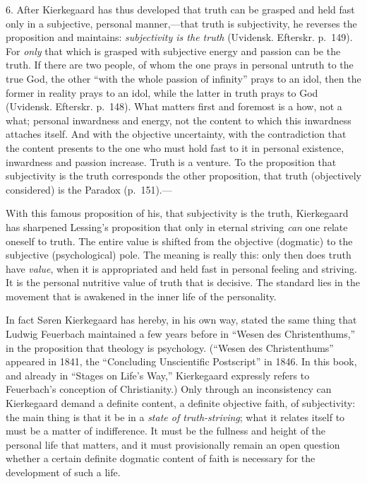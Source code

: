 \documentclass[12pt,a4paper]{book}
\newcommand{\opage}[1]{\marginnote{\footnotesize\textit{[#1]}}}
\begin{document}
6. After Kierkegaard has thus developed that truth can be grasped and
held fast only in a subjective, personal manner,---that truth is
subjectivity, he reverses the proposition and maintains:
\textit{subjectivity is the truth} (Uvidensk. Efterskr. p.~149). For
\textit{only} that which is grasped with subjective energy and passion
can be the truth. If there are two people, of whom the one prays in
personal untruth to the true God, the other ``with the whole passion of
infinity'' prays to an idol, then the former in reality prays to an idol,
while the latter in truth prays to God (Uvidensk. Efterskr. p.~148). What
matters first and foremost is a
\opage{68}how, not a what; personal inwardness and energy, not the content to
which this inwardness attaches itself. And with the objective
uncertainty, with the contradiction that the content presents to the one
who must hold fast to it in personal existence, inwardness and passion
increase. Truth is a venture. To the proposition that subjectivity is the
truth corresponds the other proposition, that truth (objectively
considered) is the Paradox (p.~151).---

With this famous proposition of his, that subjectivity is the truth,
Kierkegaard has sharpened Lessing's proposition that only in eternal
striving \textit{can} one relate oneself to truth. The entire value is
shifted from the objective (dogmatic) to the subjective (psychological)
pole. The meaning is really this: only then does truth have
\textit{value}, when it is appropriated and held fast in personal feeling
and striving. It is the personal nutritive value of truth that is
decisive. The standard lies in the movement that is awakened in the inner
life of the personality.

In fact Søren Kierkegaard has hereby, in his own way, stated the same
thing that Ludwig Feuerbach maintained a few years before in ``Wesen des
Christenthums,'' in the proposition that theology is psychology. (``Wesen
des Christenthums'' appeared in 1841, the ``Concluding Unscientific
Postscript'' in 1846. In this book, and already in ``Stages on Life's
Way,'' Kierkegaard expressly refers to Feuerbach's conception of
Christianity.) Only through an inconsistency can Kierkegaard demand a
definite content, a definite objective faith, of subjectivity: the main
thing is that it be in a \textit{state of truth-striving}; what it
relates itself to must be a matter of indifference. It must be the
fullness and height of the personal life that matters, and it must
provisionally remain an open question whether a certain
\opage{69}definite dogmatic content of faith is necessary for the development of
such a life.
\end{document}
